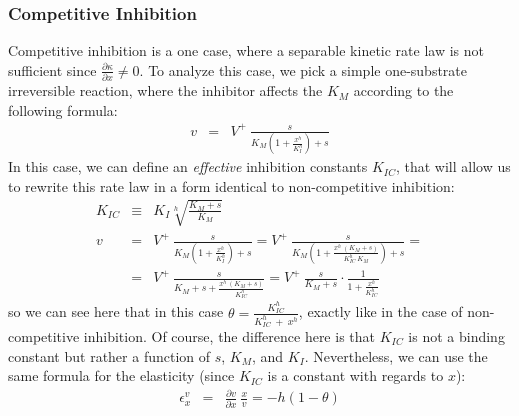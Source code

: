 \documentclass[12pt,a4paper]{article}
\begin{document}
\subsubsection{Competitive Inhibition}
Competitive inhibition is a one case, where a separable kinetic rate law is not sufficient since $\frac{\partial \kappa}{\partial x} \neq 0$. To analyze this case, we pick a simple one-substrate irreversible reaction, where the inhibitor affects the $K_M$ according to the following formula:
\begin{eqnarray}
    v &=& V^+ ~ \frac{s}{K_M \left(1 + \frac{x^h}{K_I^h}\right) + s}
\end{eqnarray}
In this case, we can define an \emph{effective} inhibition constants $K_{IC}$, that will allow us to rewrite this rate law in a form identical to non-competitive inhibition:
\begin{eqnarray}
    K_{IC} &\equiv& K_I \sqrt[h]{\frac{K_M + s}{K_M}} \nonumber\\
    v &=& V^+ ~ \frac{s}{K_M \left(1 + \frac{x^h}{K_I^h}\right) + s} =
          V^+ ~ \frac{s}{K_M \left(1 + \frac{x^h~(K_M + s)}{K_{IC}^h~K_M}\right) + s} = \nonumber\\
      &=& V^+ ~ \frac{s}{K_M + s + \frac{x^h~(K_M + s)}{K_{IC}^h}} = 
          V^+ ~ \frac{s}{K_M + s} \cdot \frac{1}{1 + \frac{x^h}{K_{IC}^h}} \label{eq:eps_comp_inh}
\end{eqnarray}
so we can see here that in this case $\theta = \frac{K_{IC}^h}{K_{IC}^h~+~x^h}$, exactly like in the case of non-competitive inhibition. Of course, the difference here is that $K_{IC}$ is not a binding constant but rather a function of $s$, $K_M$, and $K_I$. Nevertheless, we can use the same formula for the elasticity (since $K_{IC}$ is a constant with regards to $x$):
\begin{eqnarray}
    \epsilon_x^v &=& \frac{\partial v}{\partial x}~\frac{x}{v} = -h(1 - \theta)
\end{eqnarray}
\end{document}
